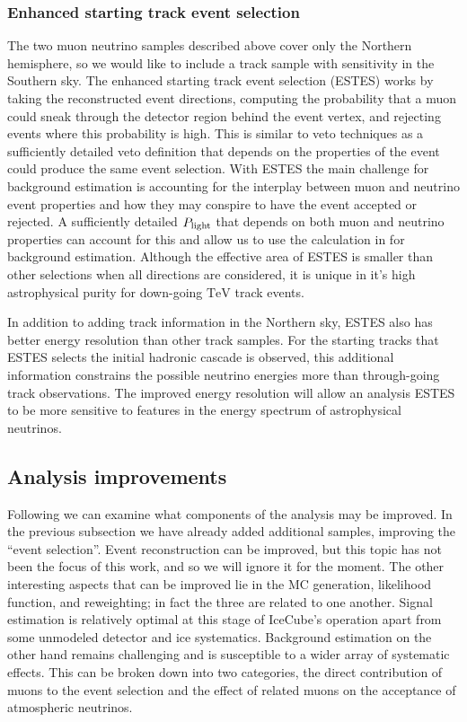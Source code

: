 \subsubsection{Enhanced starting track event selection}
The two muon neutrino samples described above cover only the Northern hemisphere, so we would like to include a track sample with sensitivity in the Southern sky.
The enhanced starting track event selection (ESTES) works by taking the reconstructed event directions, computing the probability that a muon could sneak through the detector region behind the event vertex, and rejecting events where this probability is high.
This is similar to veto techniques as a sufficiently detailed veto definition that depends on the properties of the event could produce the same event selection.
With ESTES the main challenge for background estimation is accounting for the interplay between muon and neutrino event properties and how they may conspire to have the event accepted or rejected.
A sufficiently detailed $P_{\rm light}$ that depends on both muon and neutrino properties can account for this and allow us to use the calculation in  for background estimation.
Although the effective area of ESTES is smaller than other selections when all directions are considered, it is unique in it's high astrophysical purity for down-going $\si\TeV$ track events.

In addition to adding track information in the Northern sky, ESTES also has better energy resolution than other track samples.
For the starting tracks that ESTES selects the initial hadronic cascade is observed, this additional information constrains the possible neutrino energies more than through-going track observations.
The improved energy resolution will allow an analysis ESTES to be more sensitive to features in the energy spectrum of astrophysical neutrinos.

\subsection{Analysis improvements}
Following  we can examine what components of the analysis may be improved.
In the previous subsection we have already added additional samples, improving the ``event selection''.
Event reconstruction can be improved, but this topic has not been the focus of this work, and so we will ignore it for the moment.
The other interesting aspects that can be improved lie in the MC generation, likelihood function, and reweighting; in fact the three are related to one another.
Signal estimation is relatively optimal at this stage of IceCube's operation apart from some unmodeled detector and ice systematics.
Background estimation on the other hand remains challenging and is susceptible to a wider array of systematic effects.
This can be broken down into two categories, the direct contribution of muons to the event selection and the effect of related muons on the acceptance of atmospheric neutrinos.

